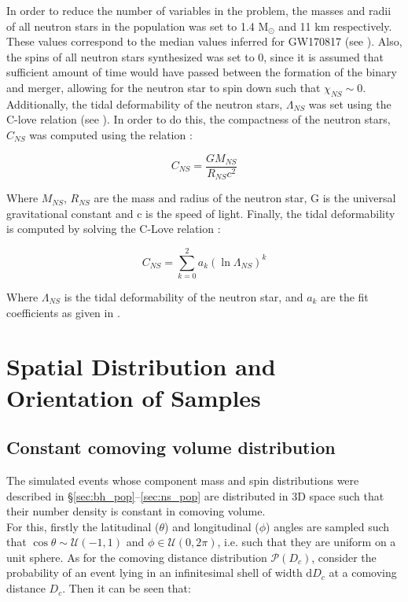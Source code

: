     In order to reduce the number of variables in the problem, the masses and radii of
    all neutron stars in the population was set to 1.4 M$_\odot$ and 11 km respectively.
    These values correspond to the median values inferred for GW170817 (see
    \cite{abbott_2018}). Also, the spins of all neutron stars synthesized was set to 0,
    since it is assumed that sufficient amount of time would have passed between the
    formation of the binary and merger, allowing for the neutron star to spin down such
    that $\chi_{NS} \sim 0$.\\
    Additionally, the tidal deformability of the neutron stars, $\Lambda_{NS}$ was set
    using the C-love relation (see \cite{yagi_2017}). In order to do this, the
    compactness of the neutron stars, $C_{NS}$ was computed using the relation :

    \begin{equation}
        C_{NS} = \dfrac{G M_{NS}}{R_{NS} c^2}
    \end{equation}

    Where $M_{NS}$, $R_{NS}$ are the mass and radius of the neutron star, G is the
    universal gravitational constant and c is the speed of light.  Finally, the tidal
    deformability is computed by solving the C-Love relation :

    \begin{equation}
        C_{NS} = \sum_{k=0}^{2} a_k (\ln \Lambda_{NS})^k
    \end{equation}

    Where $\Lambda_{NS}$ is the tidal deformability of the neutron star, and $a_k$ are
    the fit coefficients as given in \cite{yagi_2017}.

\section{Spatial Distribution and Orientation of Samples}\label{sec:space_dist}

    \subsection{Constant comoving volume distribution}

        The simulated events whose component mass and spin distributions were described
        in \S\ref{sec:bh_pop}--\ref{sec:ns_pop} are distributed in 3D space such that
        their number density is constant in comoving volume.\\ For this, firstly the
        latitudinal ($\theta$) and longitudinal ($\phi$) angles are sampled such that
        $\cos \theta \sim \mathcal{U}(-1, 1)$ and $\phi \in \mathcal{U}(0, 2\pi)$, i.e.
        such that they are uniform on a unit sphere. As for the comoving distance
        distribution $\mathcal{P}(D_c)$, consider the probability of an event lying in
        an infinitesimal shell of width d$D_c$ at a comoving distance $D_c$.  Then it
        can be seen that:

